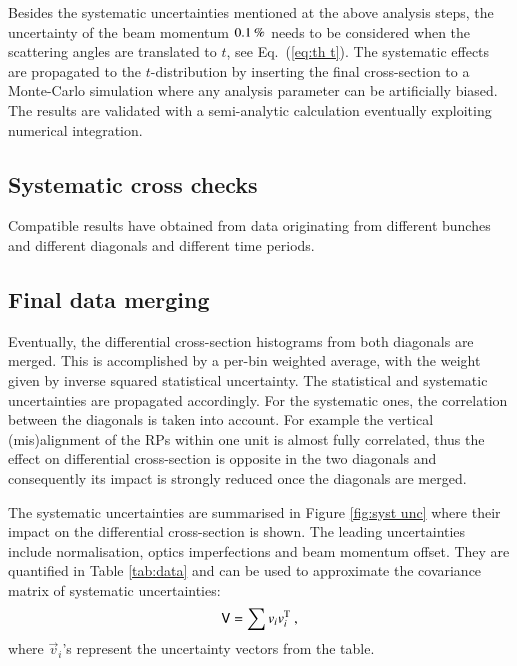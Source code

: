 Besides the systematic uncertainties mentioned at the above analysis steps, the uncertainty of the beam momentum $0.1\,{\rm \%}$ needs to be considered when the scattering angles are translated to $t$, see Eq.~(\ref{eq:th t}). The systematic effects are propagated to the $t$-distribution by inserting the final cross-section to a Monte-Carlo simulation where any analysis parameter can be artificially biased. The results are validated with a semi-analytic calculation eventually exploiting numerical integration.




\subsection{Systematic cross checks}
\label{sec:cross checks}

Compatible results have obtained from data originating from different bunches and different diagonals and different time periods.




\subsection{Final data merging}
\label{sec:final data merging}

Eventually, the differential cross-section histograms from both diagonals are merged. This is accomplished by a per-bin weighted average, with the weight given by inverse squared statistical uncertainty. The statistical and systematic uncertainties are propagated accordingly. For the systematic ones, the correlation between the diagonals is taken into account. For example the vertical (mis)alignment of the RPs within one unit is almost fully correlated, thus the effect on differential cross-section is opposite in the two diagonals and consequently its impact is strongly reduced once the diagonals are merged.

The systematic uncertainties are summarised in Figure \ref{fig:syst unc} where their impact on the differential cross-section is shown. The leading uncertainties include normalisation, optics imperfections and beam momentum offset. They are quantified in Table \ref{tab:data} and can be used to approximate the covariance matrix of systematic uncertainties:
\begin{equation}
\label{eq:covar mat}
\mathsf{V} = \sum v_i v_i^{\rm T}\ ,
\end{equation}
where $\vec v_i$'s represent the uncertainty vectors from the table.

